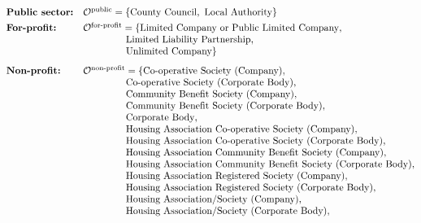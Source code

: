 \documentclass[12pt]{article}
\begin{document}
\begin{table}[!htbp]
\begin{tabular}{@{} p{} >{\raggedright\arraybackslash}p{} @{}}
\bottomrule
\end{tabular}
\end{table}
\iffalse
\[
\begin{array}{@{}l l@{}}
\textbf{Public sector:} &
\mathcal{O}^{\text{public}} = \{\text{County Council},\ \text{Local Authority}\} \\[0.4em]
\textbf{For-profit:} &
\mathcal{O}^{\text{for-profit}} = \{\text{Limited Company or Public Limited Company},\\
&\hspace{4.4em}\text{Limited Liability Partnership},\\
&\hspace{4.4em}\text{Unlimited Company}\} \\[0.8em]
\textbf{Non-profit:} &
\mathcal{O}^{\text{non-profit}} = \{\text{Co-operative Society (Company)},\\
&\hspace{4.4em}\text{Co-operative Society (Corporate Body)},\\
&\hspace{4.4em}\text{Community Benefit Society (Company)},\\
&\hspace{4.4em}\text{Community Benefit Society (Corporate Body)},\\
&\hspace{4.4em}\text{Corporate Body},\\
&\hspace{4.4em}\text{Housing Association Co-operative Society (Company)},\\
&\hspace{4.4em}\text{Housing Association Co-operative Society (Corporate Body)},\\
&\hspace{4.4em}\text{Housing Association Community Benefit Society (Company)},\\
&\hspace{4.4em}\text{Housing Association Community Benefit Society (Corporate Body)},\\
&\hspace{4.4em}\text{Housing Association Registered Society (Company)},\\
&\hspace{4.4em}\text{Housing Association Registered Society (Corporate Body)},\\
&\hspace{4.4em}\text{Housing Association/Society (Company)},\\
&\hspace{4.4em}\text{Housing Association/Society (Corporate Body)},\\

\end{array}\]
\end{document}
